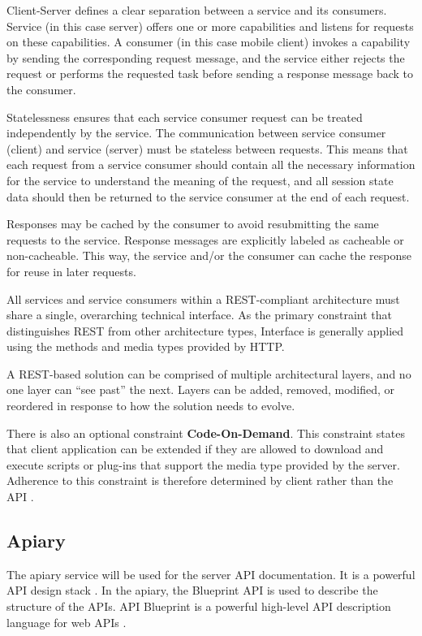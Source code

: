 \begin{itemize}

Client-Server defines a clear separation between a service and its consumers. Service (in this case server) offers one
or more capabilities and listens for requests on these capabilities. A consumer (in this case mobile client) invokes a
capability by sending the corresponding request message, and the service either rejects the request or performs
the requested task before sending a response message back to the consumer.

Statelessness ensures that each service consumer request can be treated independently by the service. The communication
between service consumer (client) and service (server) must be stateless between requests. This means that each request
from a service consumer should contain all the necessary information for the service to understand the meaning of
the request, and all session state data should then be returned to the service consumer at the end of each request.

Responses may be cached by the consumer to avoid resubmitting the same requests to the service. Response messages  are
explicitly labeled as cacheable or non-cacheable. This way, the service and/or the consumer can cache the response for
reuse in later requests.

All services and service consumers within a REST-compliant architecture must share a single, overarching technical
interface. As the primary constraint that distinguishes REST from other architecture types, Interface is generally
applied using the methods and media types provided by HTTP.

A REST-based solution can be comprised of multiple architectural layers, and no one layer can ``see past'' the next.
Layers can be added, removed, modified, or reordered in response to how the solution needs to evolve.

\end{itemize}

There is also an optional constraint \textbf{Code-On-Demand}. This constraint states that client application can be
extended if they are allowed to download and execute scripts or plug-ins that support the media type provided by
the server. Adherence to this constraint is therefore determined by client rather than the API \cite{rest}.
\pagebreak

\subsection{Apiary}
The apiary service will be used for the server API documentation. It is a powerful API design stack \cite{apiary}.
In the apiary, the Blueprint API is used to describe the structure of the APIs. API Blueprint is a powerful high-level
API description language for web APIs \cite{apiblueprint}.

